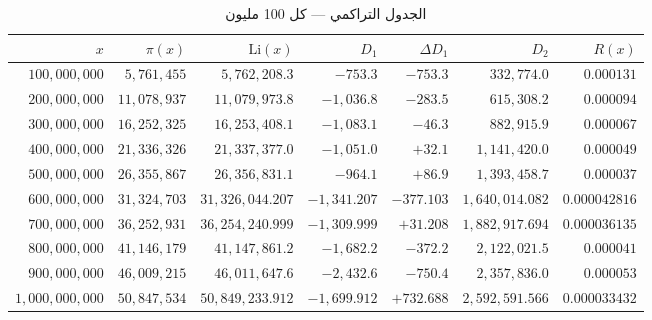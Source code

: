 \documentclass[12pt,a4paper]{article}
\begin{document}
\begin{table}[H]
\centering
\small
\begin{tabular}{rrrrrrr}
\toprule
$x$ & $\pi(x)$ & $\mathrm{Li}(x)$ & $D_1$ & $\Delta D_1$ & $D_2$ & $R(x)$ \\
\midrule
$100{,}000{,}000$ & $5{,}761{,}455$ & $5{,}762{,}208.3$ & $-753.3$ & $-753.3$ & $332{,}774.0$ & $0.000131$ \\
$200{,}000{,}000$ & $11{,}078{,}937$ & $11{,}079{,}973.8$ & $-1{,}036.8$ & $-283.5$ & $615{,}308.2$ & $0.000094$ \\
$300{,}000{,}000$ & $16{,}252{,}325$ & $16{,}253{,}408.1$ & $-1{,}083.1$ & $-46.3$ & $882{,}915.9$ & $0.000067$ \\
$400{,}000{,}000$ & $21{,}336{,}326$ & $21{,}337{,}377.0$ & $-1{,}051.0$ & $+32.1$ & $1{,}141{,}420.0$ & $0.000049$ \\
$500{,}000{,}000$ & $26{,}355{,}867$ & $26{,}356{,}831.1$ & $-964.1$ & $+86.9$ & $1{,}393{,}458.7$ & $0.000037$ \\
$600{,}000{,}000$ & $31{,}324{,}703$ & $31{,}326{,}044.207$ & $-1{,}341.207$ & $-377.103$ & $1{,}640{,}014.082$ & $0.000042816$ \\
$700{,}000{,}000$ & $36{,}252{,}931$ & $36{,}254{,}240.999$ & $-1{,}309.999$ & $+31.208$ & $1{,}882{,}917.694$ & $0.000036135$ \\
$800{,}000{,}000$ & $41{,}146{,}179$ & $41{,}147{,}861.2$ & $-1{,}682.2$ & $-372.2$ & $2{,}122{,}021.5$ & $0.000041$ \\
$900{,}000{,}000$ & $46{,}009{,}215$ & $46{,}011{,}647.6$ & $-2{,}432.6$ & $-750.4$ & $2{,}357{,}836.0$ & $0.000053$ \\
$1{,}000{,}000{,}000$ & $50{,}847{,}534$ & $50{,}849{,}233.912$ & $-1{,}699.912$ & $+732.688$ & $2{,}592{,}591.566$ & $0.000033432$ \\
\bottomrule
\end{tabular}
\caption{الجدول التراكمي — كل 100 مليون}
\end{table}
\end{document}
